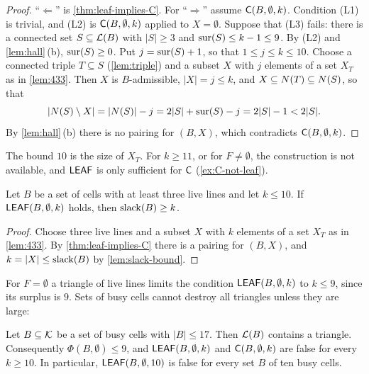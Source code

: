 \begin{proof}
``$\Leftarrow$'' is \cref{thm:leaf-implies-C}. For ``$\Rightarrow$'' assume $\mathsf{C}(B,\emptyset,k)$. Condition
(L1) is trivial, and (L2) is $\mathsf{C}(B,\emptyset,k)$ applied to $X=\emptyset$. Suppose that (L3) fails: there is
a connected set $S\subseteq\mathcal{L}(B)$ with $|S|\ge 3$ and $\operatorname{sur}(S)\le k-1\le 9$. By (L2) and
\cref{lem:hall}\,(b), $\operatorname{sur}(S)\ge 0$. Put $j=\operatorname{sur}(S)+1$, so that $1\le j\le k\le 10$. Choose a connected
triple $T\subseteq S$ (\cref{lem:triple}) and a subset $X$ with $j$ elements of a set $X_T$ as in
\cref{lem:433}. Then $X$ is $B$-admissible, $|X|=j\le k$, and $X\subseteq N(T)\subseteq N(S)$, so that
\[
  |N(S)\setminus X|=|N(S)|-j=2|S|+\operatorname{sur}(S)-j=2|S|-1<2|S| .
\]
By \cref{lem:hall}\,(b) there is no pairing for $(B,X)$, which contradicts $\mathsf{C}(B,\emptyset,k)$.
\end{proof}

The bound $10$ is the size of $X_T$. For $k\ge 11$, or for $F\ne\emptyset$, the construction is not
available, and $\mathsf{LEAF}$ is only sufficient for $\mathsf{C}$ (\cref{ex:C-not-leaf}).

\begin{corollary}\label{cor:slack-necessary}
Let $B$ be a set of cells with at least three live lines and let $k\le 10$. If $\mathsf{LEAF}(B,\emptyset,k)$
holds, then $\operatorname{slack}(B)\ge k$.
\end{corollary}

\begin{proof}
Choose three live lines and a subset $X$ with $k$ elements of a set $X_T$ as in \cref{lem:433}. By
\cref{thm:leaf-implies-C} there is a pairing for $(B,X)$, and $k=|X|\le\operatorname{slack}(B)$ by
\cref{lem:slack-bound}.
\end{proof}

For $F=\emptyset$ a triangle of live lines limits the condition $\mathsf{LEAF}(B,\emptyset,k)$ to $k\le 9$, since
its surplus is $9$. Sets of busy cells cannot destroy all triangles unless they are large:

\begin{proposition}\label{prop:busy10}
Let $B\subseteq\mathcal{K}$ be a set of busy cells with $|B|\le 17$. Then $\mathcal{L}(B)$ contains a triangle.
Consequently $\Phi(B,\emptyset)\le 9$, and $\mathsf{LEAF}(B,\emptyset,k)$ and $\mathsf{C}(B,\emptyset,k)$ are false for
every $k\ge 10$. In particular, $\mathsf{LEAF}(B,\emptyset,10)$ is false for every set $B$ of ten busy cells.
\end{proposition}

